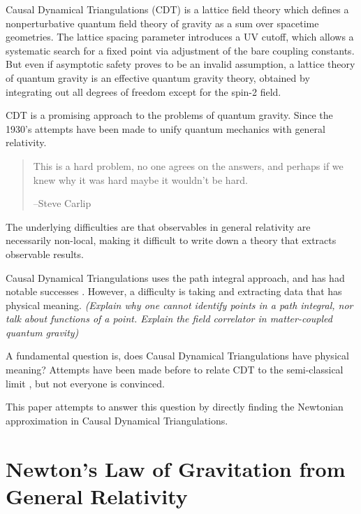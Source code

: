 \documentclass[12pt]{article}
\begin{document}
Causal Dynamical Triangulations (CDT) is a lattice field theory which defines a nonperturbative quantum field theory of gravity as a sum over spacetime geometries. The lattice spacing parameter introduces a UV cutoff, which allows a systematic search for a fixed point via adjustment of the bare coupling constants. But even if asymptotic safety proves to be an invalid assumption, a lattice theory of quantum gravity is an effective quantum gravity theory, obtained by integrating out all degrees of freedom except for the spin-2 field.

CDT \cite{ambjorn_geometry_1996,cdt,ambjorn_nonperturbative_2012} is a promising approach to the problems of quantum gravity. Since the 1930's \cite{rovelli_notes_2000} attempts have been made to unify quantum mechanics with general relativity.

\begin{quote}
This is a hard problem, no one agrees on the answers, and perhaps if we knew why it was hard maybe it wouldn't be hard.

--Steve Carlip
\end{quote}

The underlying difficulties are that observables in general relativity are necessarily non-local, making it difficult to write down a theory that extracts observable results.

Causal Dynamical Triangulations uses the path integral approach, and has had notable successes \cite{kommu_validation_2011}. However, a difficulty is taking and extracting data that has physical meaning. \textit{(Explain why one cannot identify points in a path integral, nor talk about functions of a point. Explain the field correlator in matter-coupled quantum gravity)}



A fundamental question is, does Causal Dynamical Triangulations have physical meaning? Attempts have been made before to relate CDT to the semi-classical limit \cite{ambjorn_semiclassical_2011,ambjorn_semiclassical}, but not everyone is convinced.

This paper attempts to answer this question by directly finding the Newtonian approximation in Causal Dynamical Triangulations.

\section{Newton's Law of Gravitation from General Relativity}
\label{sec:newtons-law}
\end{document}
